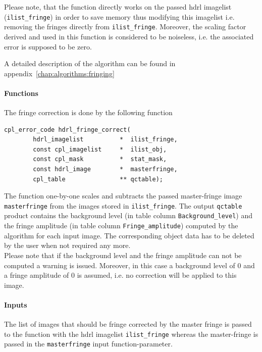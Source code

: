 Please note, that the function directly works on the passed hdrl
imagelist (\verb,ilist_fringe,) in order to save memory thus modifying
this imagelist i.e. removing the fringes directly from
\verb,ilist_fringe,. Moreover, the scaling factor derived and used in
this function is considered to be noiseless, i.e. the associated error
is supposed to be zero.

A detailed description of the algorithm can be found in
appendix~\ref{chap:algorithms:fringing}

\paragraph{Functions}
\label{fringe:algorithms:correct:functions}

The fringe correction is done by the following function

\begin{lstlisting}
cpl_error_code hdrl_fringe_correct(
        hdrl_imagelist          *  ilist_fringe, 
        const cpl_imagelist     *  ilist_obj,
        const cpl_mask          *  stat_mask, 
        const hdrl_image        *  masterfringe,
        cpl_table               ** qctable);
\end{lstlisting}

The function one-by-one scales and subtracts the passed master-fringe
image \verb,masterfringe, from the images stored in
\verb,ilist_fringe,. The output \verb+qctable+ product contains the
background level (in table column \verb+Background_level+) and the
fringe amplitude (in table column \verb+Fringe_amplitude+) computed by
the algorithm for each input image. The corresponding object data has
to be deleted by the user when not required any more.\\
Please note that if the background level and the fringe amplitude can
not be computed a warning is issued. Moreover, in this case a
background level of 0 and a fringe amplitude of 0 is assumed, i.e. no
correction will be applied to this image.



\paragraph{Inputs}
\label{fringe:algorithms:correct:inputs}


The list of images that should be fringe corrected by the master
fringe is passed to the function with the hdrl imagelist
\verb+ilist_fringe+ whereas the master-fringe is passed in the
\verb+masterfringe+ input function-parameter.

